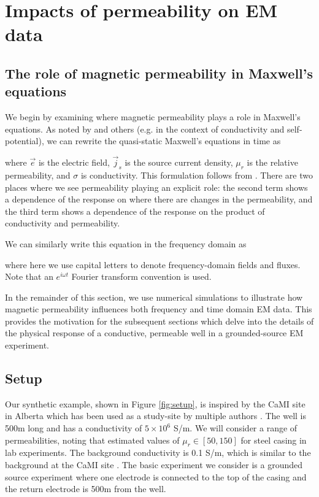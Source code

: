 \documentclass[onecolumn, extra, mreferee]{gji}
\begin{document}
\section{Impacts of permeability on EM data}
\label{sec:setup}
\subsection{The role of magnetic permeability in Maxwell's equations}
We begin by examining where magnetic permeability plays a role in Maxwell's equations. As noted by \cite{Ward1988, Pavlov2001, Noh2016} and others (e.g. \cite{revil_self-potential_2013} in the context of conductivity and self-potential), we can rewrite the quasi-static Maxwell's equations in time as

where $\vec{e}$ is the electric field, $\vec{j}_s$ is the source current density, $\mu_r$ is the relative permeability, and $\sigma$ is conductivity. This formulation follows from \citep{Pavlov2001}. There are two places where we see permeability playing an explicit role: the second term shows a dependence of the response on where there are changes in the permeability, and the third term shows a dependence of the response on the product of conductivity and permeability.

We can similarly write this equation in the frequency domain as

where here we use capital letters to denote frequency-domain fields and fluxes. Note that an $e^{i\omega t}$ Fourier transform convention is used.

In the remainder of this section, we use numerical simulations to illustrate how magnetic permeability influences both frequency and time domain EM data. This provides the motivation for the subsequent sections which delve into the details of the physical response of a conductive, permeable well in a grounded-source EM experiment.
\subsection{Setup}

Our synthetic example, shown in Figure \ref{fig:setup}, is inspired by the CaMI site in Alberta which has been used as a study-site by multiple authors \citep{wilt_casing_2020, beskardes_effects_2021}. The well is 500m long and has a conductivity of $5\times10^6$ S/m. We will consider a range of permeabilities, noting that \citep{Wu1994} estimated values of $\mu_r \in [50, 150]$ for steel casing in lab experiments. The background conductivity is 0.1 S/m, which is similar to the background at the CaMI site \citep{um_joint_2020, lawton_development_2019}. The basic experiment we consider is a grounded source experiment where one electrode is connected to the top of the casing and the return electrode is 500m from the well.
\end{document}
